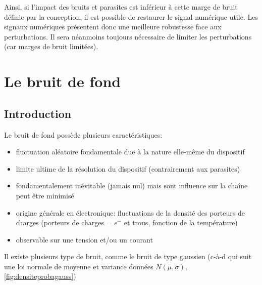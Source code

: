 Ainsi, si l'impact des bruits et parasites est inférieur à cette marge de bruit définie par la conception, il est possible de restaurer le signal numérique utile. Les signaux numériques présentent donc une meilleure robustesse face aux perturbations. Il sera néanmoins toujours nécessaire de limiter les perturbations (car marges de bruit limitées).
\section{Le bruit de fond}
\subsection{Introduction}
Le bruit de fond possède plusieurs caractéristiques:
\begin{itemize}
	\item fluctuation aléatoire fondamentale due à la nature elle-même du dispositif
	\item limite ultime de la résolution du dispositif (contrairement aux parasites)
	\item fondamentalement inévitable (jamais nul) mais sont influence sur la chaîne peut être minimisé
	\item origine générale en électronique: fluctuations de la densité des porteurs de charges (porteurs de charges = \(e^-\) et trous, fonction de la température)
	\item observable sur une tension et/ou un courant
\end{itemize}
Il existe plusieurs type de bruit, comme le bruit de type gaussien (c-à-d qui suit une loi normale de moyenne et variance données \(N(\mu,\sigma)\), \autoref{fig:densiteprobagauss})

